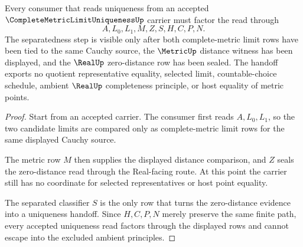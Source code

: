 \begin{theorem}
\label{thm:complete-metric-limit-uniqueness-separatedness}
Every consumer that reads uniqueness from an accepted $\CompleteMetricLimitUniquenessUp$ carrier must factor the read through
$$
A,L_{0},L_{1},M,Z,S,H,C,P,N .
$$
The separatedness step is visible only after both complete-metric limit rows have been tied to the same Cauchy source, the $\MetricUp$ distance witness has been displayed, and the $\RealUp$ zero-distance row has been sealed. The handoff exports no quotient representative equality, selected limit, countable-choice schedule, ambient $\RealUp$ completeness principle, or host equality of metric points.
\end{theorem}
\begin{proof}
Start from an accepted carrier. The consumer first reads $A,L_{0},L_{1}$, so the two candidate limits are compared only as complete-metric limit rows for the same displayed Cauchy source.

The metric row $M$ then supplies the displayed distance comparison, and $Z$ seals the zero-distance read through the Real-facing route. At this point the carrier still has no coordinate for selected representatives or host point equality.

The separated classifier $S$ is the only row that turns the zero-distance evidence into a uniqueness handoff. Since $H,C,P,N$ merely preserve the same finite path, every accepted uniqueness read factors through the displayed rows and cannot escape into the excluded ambient principles.
\end{proof}

